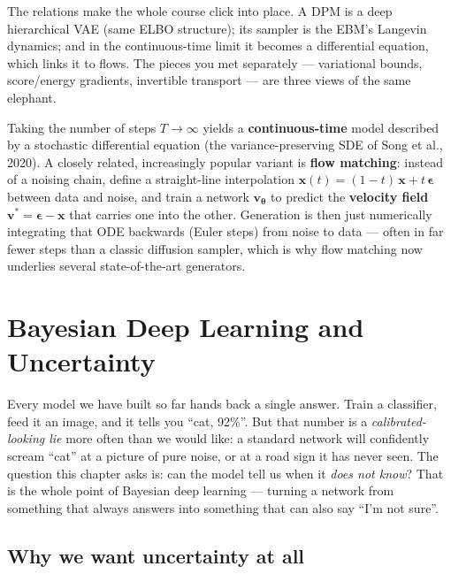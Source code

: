 \documentclass[11pt, oneside]{book}
\newcommand{\params}{\boldsymbol{\theta}}
\newcommand{\xvec}{\mathbf{x}}
\begin{document}
\begin{intbox}
The relations make the whole course click into place. A DPM is a deep hierarchical
VAE (same ELBO structure); its sampler is the EBM's Langevin dynamics; and in the
continuous-time limit it becomes a differential equation, which links it to flows.
The pieces you met separately --- variational bounds, score/energy gradients,
invertible transport --- are three views of the same elephant.
\end{intbox}

Taking the number of steps $T\to\infty$ yields a \textbf{continuous-time} model
described by a stochastic differential equation (the variance-preserving SDE of
Song et al., 2020). A closely related, increasingly popular variant is
\textbf{flow matching}: instead of a noising chain, define a straight-line
interpolation $\xvec(t) = (1-t)\,\xvec + t\,\boldsymbol{\epsilon}$ between data and
noise, and train a network $\boldsymbol{v}_{\params}$ to predict the
\textbf{velocity field} $\boldsymbol{v}^{*} = \boldsymbol{\epsilon} - \xvec$ that
carries one into the other. Generation is then just numerically integrating that
ODE backwards (Euler steps) from noise to data --- often in far fewer steps than a
classic diffusion sampler, which is why flow matching now underlies several
state-of-the-art generators.


\chapter{Bayesian Deep Learning and Uncertainty}

Every model we have built so far hands back a single answer. Train a classifier,
feed it an image, and it tells you ``cat, 92\%''. But that number is a
\emph{calibrated-looking lie} more often than we would like: a standard network
will confidently scream ``cat'' at a picture of pure noise, or at a road sign it
has never seen. The question this chapter asks is: can the model tell us when it
\emph{does not know}? That is the whole point of Bayesian deep learning ---
turning a network from something that always answers into something that can also
say ``I'm not sure''.

\section{Why we want uncertainty at all}
\end{document}

